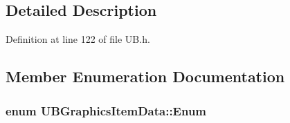 \subsection{Detailed Description}


Definition at line 122 of file U\-B.\-h.



\subsection{Member Enumeration Documentation}
\hypertarget{struct_u_b_graphics_item_data_a25580b2117f348914ccb50e97700864b}{
\subsubsection[{Enum}]{\setlength{\rightskip}{0pt plus 5cm}enum {\bf U\-B\-Graphics\-Item\-Data\-::\-Enum}}}\label{dc/dbe/struct_u_b_graphics_item_data_a25580b2117f348914ccb50e97700864b}
